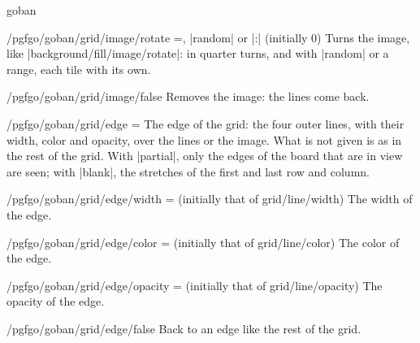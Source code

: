 \begin{environment}{{goban}}
	\begin{key}{/pgfgo/goban/grid/image/rotate =, |random| or |:| (initially 0)}
		Turns the image, like |background/fill/image/rotate|: in quarter turns, and with |random| or a range, each tile with its own.
	\end{key}

	\begin{stylekey}{/pgfgo/goban/grid/image/false}
		Removes the image: the lines come back.
	\end{stylekey}

	\begin{key}{/pgfgo/goban/grid/edge =}
		The edge of the grid: the four outer lines, with their width, color and opacity, over the lines or the image. What is not given is as in the rest of the grid. With |partial|, only the edges of the board that are in view are seen; with |blank|, the stretches of the first and last row and column.

		\begin{codeexample}[]
			\begin{goban}[5, grid = {edge = {width = 1.5pt}}]
			\end{goban}

			\begin{goban}[9, partial = A1:E5, grid = {edge = {width = 1.5pt, color = brown}}]
			\end{goban}
		\end{codeexample}
	\end{key}

	\begin{key}{/pgfgo/goban/grid/edge/width = (initially that of grid/line/width)}
		The width of the edge.
	\end{key}

	\begin{key}{/pgfgo/goban/grid/edge/color = (initially that of grid/line/color)}
		The color of the edge.
	\end{key}

	\begin{key}{/pgfgo/goban/grid/edge/opacity = (initially that of grid/line/opacity)}
		The opacity of the edge.
	\end{key}

	\begin{stylekey}{/pgfgo/goban/grid/edge/false}
		Back to an edge like the rest of the grid.
	\end{stylekey}


\end{environment}
